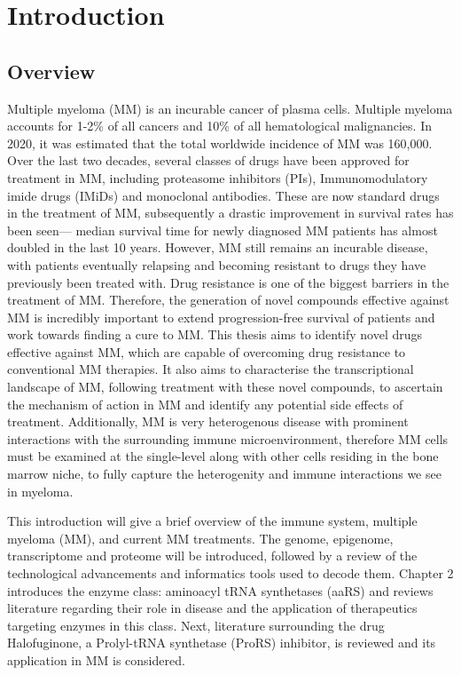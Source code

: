 \chapter{\label{ch:1-intro}Introduction} 


\section{Overview}
Multiple myeloma (MM) is an incurable cancer of plasma cells.
Multiple myeloma accounts for 1-2\% of all cancers and 10\% of all hematological malignancies\cite{international2003criteria}.
In 2020, it was estimated that the total worldwide incidence of MM was 160,000\cite{ludwig2020multiple}.
Over the last two decades, several classes of drugs have been approved for treatment in MM, including proteasome inhibitors (PIs), Immunomodulatory imide drugs (IMiDs) and monoclonal antibodies.
These are now standard drugs in the treatment of MM, subsequently a drastic improvement in survival rates has been seen--- median survival time for newly diagnosed MM patients has almost doubled in the last 10 years\cite{kazandjian2016look}.
However, MM still remains an incurable disease, with patients eventually relapsing and becoming resistant to drugs they have previously been treated with.
Drug resistance is one of the biggest barriers in the treatment of MM.
Therefore, the generation of novel compounds effective against MM is incredibly important to extend progression-free survival of patients and work towards finding a cure to MM\@.
This thesis aims to identify novel drugs effective against MM, which are capable of overcoming drug resistance to conventional MM therapies.
It also aims to characterise the transcriptional landscape of MM, following treatment with these novel compounds, to ascertain the mechanism of action in MM and identify any potential side effects of treatment.
Additionally, MM is very heterogenous disease with prominent interactions with the surrounding immune microenvironment, therefore MM cells must be examined at the single-level along with other cells residing in the bone marrow niche, to fully capture the heterogenity and immune interactions we see in myeloma.

This introduction will give a brief overview of the immune system, multiple myeloma (MM), and current MM treatments.
The genome, epigenome, transcriptome and proteome will be introduced, followed by a review of the technological advancements and informatics tools used to decode them.
Chapter 2 introduces the enzyme class: aminoacyl tRNA synthetases (aaRS) and reviews literature regarding their role in disease and the application of therapeutics targeting enzymes in this class.
Next, literature surrounding the drug Halofuginone, a Prolyl-tRNA synthetase (ProRS) inhibitor, is reviewed and its application in MM is considered.

